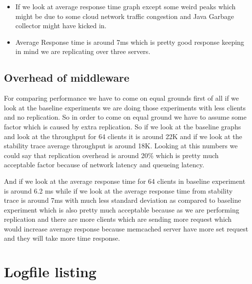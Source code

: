 \documentclass[11pt]{article}
\begin{document}
\begin{itemize}
	\item If we look at average response time graph except some weird peaks which might be due to some cloud network traffic congestion and Java Garbage collector might have kicked in.
	\item Average Response time is around 7ms which is pretty good response keeping in mind we are replicating over three servers.
\end{itemize}
\subsection{Overhead of middleware}

For comparing performance we have to come on equal grounds first of all if we look at the baseline experiments we are doing those experiments with less clients and no replication. So in order to come on equal ground we have to assume some factor which is caused by extra replication. So if we look at the baseline graphs and look at the throughput for 64 clients it is around 22K and if we look at the stability trace average throughput is around 18K. Looking at this numbers we could say that replication overhead is around 20\% which is pretty much acceptable factor because of network latency and queueing latency.

And if we look at the average response time for 64 clients in baseline experiment is around 6.2 ms while if we look at the average response time from stability trace is around 7ms with much less standard deviation as compared to baseline experiment which is also pretty much acceptable because as we are performing replication and there are more clients which are sending more request which would increase average response because memcached server have more set request and they will take more time response.

\pagebreak

\section*{Logfile listing}
\end{document}
